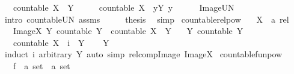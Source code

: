 \begin{isabellebody}
\ \ \ {\isachardoublequoteopen}countable\ {\isacharparenleft}X\ {\isacharbackquote}{\isacharbackquote}\ Y{\isacharparenright}{\isachardoublequoteclose}\isanewline
%
\isadelimproof
%
\endisadelimproof
%
\isatagproof
{}\isamarkupfalse%
\ {\isacharminus}\isanewline
\ \ \isamarkupfalse%
\ {\isachardoublequoteopen}countable\ {\isacharparenleft}X\ {\isacharbackquote}{\isacharbackquote}\ {\isacharparenleft}{\isasymUnion}y{\isasymin}Y{\isachardot}\ {\isacharbraceleft}y{\isacharbraceright}{\isacharparenright}{\isacharparenright}{\isachardoublequoteclose}\isanewline
\ \ \ \ \isamarkupfalse%
\ Image{\isacharunderscore}UN\ \isamarkupfalse%
\ {\isacharparenleft}intro\ countable{\isacharunderscore}UN\ assms{\isacharparenright}\isanewline
\ \ \isamarkupfalse%
\ \isamarkupfalse%
\ {\isacharquery}thesis\ \isamarkupfalse%
\ simp\isanewline
{}\isamarkupfalse%
%
\endisatagproof
{\isafoldproof}%
%
\isadelimproof
\isanewline
%
\endisadelimproof
\isanewline
{}\isamarkupfalse%
\ countable{\isacharunderscore}relpow{\isacharcolon}\isanewline
\ \ \ X\ {\isacharcolon}{\isacharcolon}\ {\isachardoublequoteopen}{\isacharprime}a\ rel{\isachardoublequoteclose}\isanewline
\ \ \ Image{\isacharunderscore}X{\isacharcolon}\ {\isachardoublequoteopen}{\isasymAnd}Y{\isachardot}\ countable\ Y\ {\isasymLongrightarrow}\ countable\ {\isacharparenleft}X\ {\isacharbackquote}{\isacharbackquote}\ Y{\isacharparenright}{\isachardoublequoteclose}\isanewline
\ \ \ Y{\isacharcolon}\ {\isachardoublequoteopen}countable\ Y{\isachardoublequoteclose}\isanewline
\ \ \ {\isachardoublequoteopen}countable\ {\isacharparenleft}{\isacharparenleft}X\ {\isacharcircum}{\isacharcircum}\ i{\isacharparenright}\ {\isacharbackquote}{\isacharbackquote}\ Y{\isacharparenright}{\isachardoublequoteclose}\isanewline
%
\isadelimproof
\ \ %
\endisadelimproof
%
\isatagproof
{}\isamarkupfalse%
\ Y\ \isamarkupfalse%
\ {\isacharparenleft}induct\ i\ arbitrary{\isacharcolon}\ Y{\isacharparenright}\ {\isacharparenleft}auto\ simp{\isacharcolon}\ relcomp{\isacharunderscore}Image\ Image{\isacharunderscore}X{\isacharparenright}%
\endisatagproof
{\isafoldproof}%
%
\isadelimproof
\isanewline
%
\endisadelimproof
\isanewline
{}\isamarkupfalse%
\ countable{\isacharunderscore}funpow{\isacharcolon}\isanewline
\ \ \ f\ {\isacharcolon}{\isacharcolon}\ {\isachardoublequoteopen}{\isacharprime}a\ set\ {\isasymRightarrow}\ {\isacharprime}a\ set{\isachardoublequoteclose}\isanewline

\end{isabellebody}
